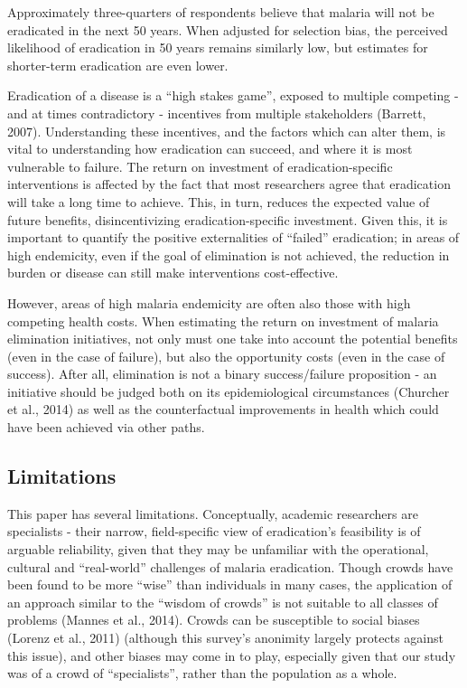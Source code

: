 \documentclass[]{article}
\begin{document}
Approximately three-quarters of respondents believe that malaria will
not be eradicated in the next 50 years. When adjusted for selection
bias, the perceived likelihood of eradication in 50 years remains
similarly low, but estimates for shorter-term eradication are even
lower.

Eradication of a disease is a ``high stakes game'', exposed to multiple
competing - and at times contradictory - incentives from multiple
stakeholders (Barrett, 2007). Understanding these incentives, and the
factors which can alter them, is vital to understanding how eradication
can succeed, and where it is most vulnerable to failure. The return on
investment of eradication-specific interventions is affected by the fact
that most researchers agree that eradication will take a long time to
achieve. This, in turn, reduces the expected value of future benefits,
disincentivizing eradication-specific investment. Given this, it is
important to quantify the positive externalities of ``failed''
eradication; in areas of high endemicity, even if the goal of
elimination is not achieved, the reduction in burden or disease can
still make interventions cost-effective.

However, areas of high malaria endemicity are often also those with high
competing health costs. When estimating the return on investment of
malaria elimination initiatives, not only must one take into account the
potential benefits (even in the case of failure), but also the
opportunity costs (even in the case of success). After all, elimination
is not a binary success/failure proposition - an initiative should be
judged both on its epidemiological circumstances (Churcher et al., 2014)
as well as the counterfactual improvements in health which could have
been achieved via other paths.

\subsection{Limitations}\label{limitations}

This paper has several limitations. Conceptually, academic researchers
are specialists - their narrow, field-specific view of eradication's
feasibility is of arguable reliability, given that they may be
unfamiliar with the operational, cultural and ``real-world'' challenges
of malaria eradication. Though crowds have been found to be more
``wise'' than individuals in many cases, the application of an approach
similar to the ``wisdom of crowds'' is not suitable to all classes of
problems (Mannes et al., 2014). Crowds can be susceptible to social
biases (Lorenz et al., 2011) (although this survey's anonimity largely
protects against this issue), and other biases may come in to play,
especially given that our study was of a crowd of ``specialists'',
rather than the population as a whole.
\end{document}
